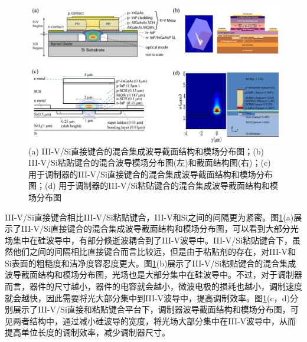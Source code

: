 \begin{figure}[htb]
	\centering
	\includegraphics[width=12cm]{./Pictures/fig_hybrid_wg_cross.jpg}
	\caption{ (a) III-V/Si直接键合的混合集成波导截面结构和模场分布图\cite{fang2006electrically}；(b) III-V/Si粘贴键合的混合波导模场分布图(左)和截面结构图(右)\cite{stankovic2010evanescently}；(c) 用于调制器的III-V/Si直接键合的混合集成波导截面结构和模场分布图\cite{tang201150}；(d) 用于调制器的III-V/Si粘贴键合的混合集成波导截面结构和模场分布图}
	\label{fig_hybrid_wg_cross}
\end{figure}

III-V/Si直接键合相比III-V/Si粘贴键合，III-V和Si之间的间隔更为紧密。图\ref{fig_hybrid_wg_cross}(a)展示了III-V/Si直接键合的混合集成波导截面结构和模场分布图，可以看到大部分光场集中在硅波导中，有部分倏逝波耦合到了III-V波导中。III-V/Si粘贴键合下，虽然他们之间的间隔相比直接键合而言比较远，但是由于粘贴剂的存在，对III-V和Si表面的粗糙度和洁净度容忍度更大\cite{gunther2007}。图\ref{fig_hybrid_wg_cross}(b)展示了III-V/Si粘贴键合的混合集成波导截面结构和模场分布图，光场也是大部分集中在硅波导中。不过，对于调制器而言，器件的尺寸越小，器件的电容就会越小，微波电极的损耗也越小，调制速度就会越快，因此需要将光大部分集中到III-V波导中，提高调制效率。图\ref{fig_hybrid_wg_cross}(c，d)分别展示了III-V/Si直接和粘贴键合平台下，调制器波导截面结构和模场分布图，可见两者结构中，通过减小硅波导的宽度，将光场大部分集中在III-V波导中，从而提高单位长度的调制效率，减少调制器尺寸。

